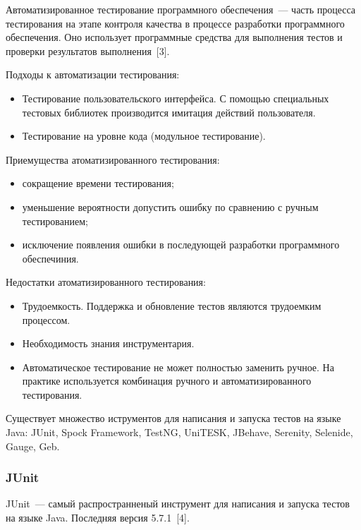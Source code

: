  Автоматизированное тестирование программного обеспечения~--- часть процесса тестирования на этапе контроля качества в процессе разработки программного обеспечения. Оно использует программные средства для выполнения тестов и проверки результатов выполнения~[3].
 
 Подходы к автоматизации тестирования:
 
 \begin{itemize}
 	\item Тестирование пользовательского интерфейса. С помощью специальных тестовых библиотек производится имитация действий пользователя.
 	\item Тестирование на уровне кода (модульное тестирование).
 \end{itemize} 

 Приемущества атоматизированного тестирования:

\begin{itemize}
	\item сокращение времени тестирования; 
	\item уменьшение вероятности допустить ошибку по сравнению с ручным тестированием;
	\item исключение появления ошибки в последующей разработки программного обеспечиния.
\end{itemize} 

 Недостатки атоматизированного тестирования:

\begin{itemize}
	\item Трудоемкость. Поддержка и обновление тестов являются трудоемким процессом.
	\item Необходимость знания инструментария.
	\item Автоматическое тестирование не может полностью заменить ручное. На практике используется комбинация ручного и автоматизированного тестирования.
\end{itemize} 

Существует множество иструментов для написания и запуска тестов на языке Java: JUnit, Spock Framework, TestNG, UniTESK, JBehave, Serenity, Selenide, Gauge, Geb.


\subsubsection{JUnit}

JUnit~--- самый распространненый инструмент для написания и запуска тестов на языке Java. Последняя версия 5.7.1~[4].

